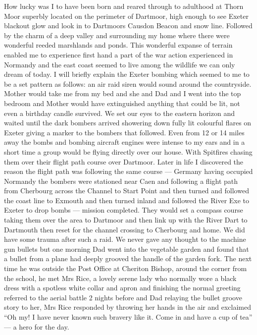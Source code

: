 
How lucky was I to have been born and reared through to adulthood at Thorn Moor
superbly located on the perimeter of Dartmoor, high enough to see Exeter
blackout glow and look in to Dartmoors Causdon Beacon and snow line. Followed
by the charm of a deep valley and surrounding my home where there were
wonderful reeded marshlands and ponds. This wonderful expanse of terrain
enabled me to experience first hand a part of the war action experienced in
Normandy and the east coast seemed to live among the wildlife we can only dream
of today. I will briefly explain the Exeter bombing which seemed to me to be a
set pattern as follows: an air raid siren would sound around the countryside.
Mother would take me from my bed and she and Dad and I went into the top
bedroom and Mother would have extinguished anything that could be lit, not even
a birthday candle survived. We set our eyes to the eastern horizon and waited
until the dark bombers arrived showering down fully lit colourful flares on
Exeter giving a marker to the bombers that followed. Even from 12 or 14 miles
away the bombs and bombing aircraft engines were intense to my ears and in a
short time a group would be flying directly over our house. With Spitfires
chasing them over their flight path course over Dartmoor. Later in life I
discovered the reason the flight path was following the same course --- Germany
having occupied Normandy the bombers were stationed near Caen and following a
flight path from Cherbourg across the Channel to Start Point and then turned
and followed the coast line to Exmouth and then turned inland and followed the
River Exe to Exeter to drop bombs --- mission completed. They would set a
compass course taking them over the area to Dartmoor and then link up with the
River Dart to Dartmouth then reset for the channel crossing to Cherbourg and
home. We did have some trauma after such a raid. We never gave any thought to
the machine gun bullets but one morning Dad went into the vegetable garden and
found that a bullet from a plane had deeply grooved the handle of the garden
fork. The next time he was outside the Post Office at Cheriton Bishop, around
the corner from the school, he met Mrs Rice, a lovely serene lady who normally
wore a black dress with a spotless white collar and apron and finishing the
normal greeting referred to the aerial battle 2 nights before and Dad relaying
the bullet groove story to her, Mrs Rice responded by throwing her hands in the
air and exclaimed ``Oh my! I have never known such bravery like it. Come in and
have a cup of tea'' --- a hero for the day.

